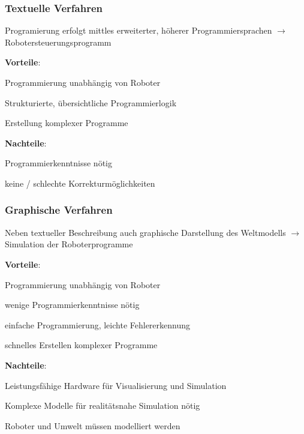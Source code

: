 \subsubsection{Textuelle Verfahren}
\begin{compactitem}
    \item Programierung erfolgt mittles erweiterter, höherer Programmiersprachen $\rightarrow$
    Robotersteuerungsprogramm
    \item \textbf{Vorteile}:
    \begin{compactitem}
        \item Programmierung unabhängig von Roboter
        \item Strukturierte, übersichtliche Programmierlogik
        \item Erstellung komplexer Programme
    \end{compactitem}
    \item \textbf{Nachteile}:
    \begin{compactitem}
        \item Programmierkenntnisse nötig
        \item keine / schlechte Korrekturmöglichkeiten
    \end{compactitem}
\end{compactitem}
\subsubsection{Graphische Verfahren }
\begin{compactitem}
    \item Neben textueller Beschreibung auch graphische Darstellung des Weltmodells $\rightarrow$ Simulation der
    Roboterprogramme
    \item \textbf{Vorteile}:
    \begin{compactitem}
        \item Programmierung unabhängig von Roboter
        \item wenige Programmierkenntnisse nötig
        \item einfache Programmierung, leichte Fehlererkennung
        \item schnelles Erstellen komplexer Programme
    \end{compactitem}
    \item \textbf{Nachteile}:
    \begin{compactitem}
        \item Leistungsfähige Hardware für Visualisierung und Simulation
        \item Komplexe Modelle für realitätsnahe Simulation nötig
        \item Roboter und Umwelt müssen modelliert werden
    \end{compactitem}
\end{compactitem}

